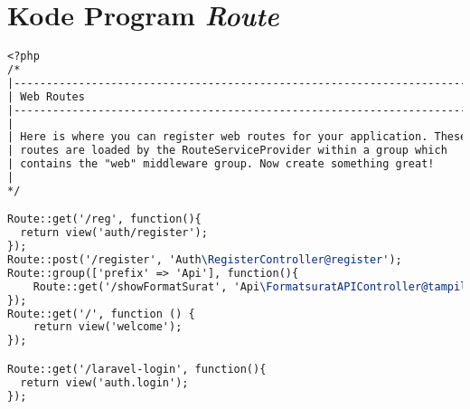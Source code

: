 \chapter{Kode Program \textit{Route}}
\label{lamp:F}

\begin{lstlisting}[language=tex,basicstyle=
\tiny,caption=route.php]
<?php
/*
|--------------------------------------------------------------------------
| Web Routes
|--------------------------------------------------------------------------
|
| Here is where you can register web routes for your application. These
| routes are loaded by the RouteServiceProvider within a group which
| contains the "web" middleware group. Now create something great!
|
*/

Route::get('/reg', function(){
  return view('auth/register');
});
Route::post('/register', 'Auth\RegisterController@register');
Route::group(['prefix' => 'Api'], function(){
    Route::get('/showFormatSurat', 'Api\FormatsuratAPIController@tampilkanFormat');
});
Route::get('/', function () {
    return view('welcome');
});

Route::get('/laravel-login', function(){
  return view('auth.login');
});


\end{lstlisting}
